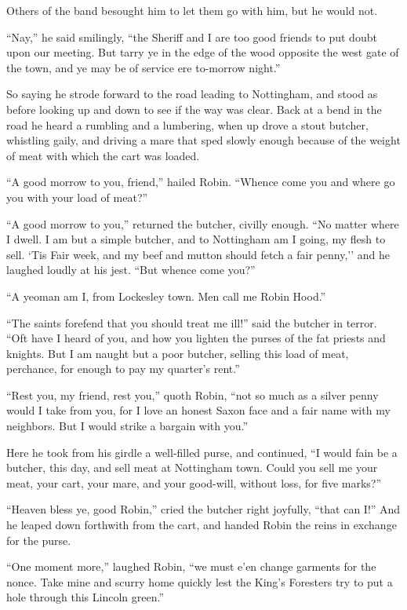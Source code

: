 Others of the band besought him to let them go with him, but he would
not.

``Nay,'' he said smilingly, ``the Sheriff and I are too good friends to
put doubt upon our meeting. But tarry ye in the edge of the wood
opposite the west gate of the town, and ye may be of service ere
to-morrow night.''

So saying he strode forward to the road leading to Nottingham, and stood
as before looking up and down to see if the way was clear. Back at a
bend in the road he heard a rumbling and a lumbering, when up drove a
stout butcher, whistling gaily, and driving a mare that sped slowly
enough because of the weight of meat with which the cart was loaded.

``A good morrow to you, friend,'' hailed Robin. ``Whence come you and
where go you with your load of meat?''

``A good morrow to you,'' returned the butcher, civilly enough. ``No
matter where I dwell. I am but a simple butcher, and to Nottingham am I
going, my flesh to sell. `Tis Fair week, and my beef and mutton should
fetch a fair penny,'' and he laughed loudly at his jest. ``But whence
come you?''

``A yeoman am I, from Lockesley town. Men call me Robin Hood.''

``The saints forefend that you should treat me ill!'' said the butcher
in terror. ``Oft have I heard of you, and how you lighten the purses of
the fat priests and knights. But I am naught but a poor butcher, selling
this load of meat, perchance, for enough to pay my quarter's rent.''

``Rest you, my friend, rest you,'' quoth Robin, ``not so much as a
silver penny would I take from you, for I love an honest Saxon face and
a fair name with my neighbors. But I would strike a bargain with you.''

Here he took from his girdle a well-filled purse, and continued, ``I
would fain be a butcher, this day, and sell meat at Nottingham town.
Could you sell me your meat, your cart, your mare, and your good-will,
without loss, for five marks?''

``Heaven bless ye, good Robin,'' cried the butcher right joyfully,
``that can I!'' And he leaped down forthwith from the cart, and handed
Robin the reins in exchange for the purse.

``One moment more,'' laughed Robin, ``we must e'en change garments for
the nonce. Take mine and scurry home quickly lest the King's Foresters
try to put a hole through this Lincoln green.''

